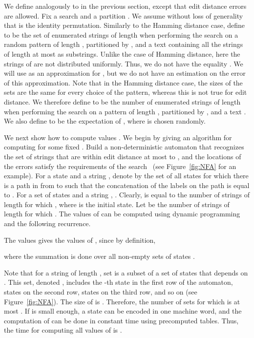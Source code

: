 \documentclass[12pt]{article}
\begin{document}
We define  analogously to 
in the previous section, except that edit distance errors are allowed.
Fix a search  and a partition .
We assume without loss of generality that  is the identity permutation.
Similarly to the Hamming distance case,
define  to be the set of enumerated strings of length 
when performing the search  on a random pattern of length ,
partitioned by ,
and a text  containing all the strings of length at most  as
substrings.
Unlike the case of Hamming distance, here the strings of  are not
distributed uniformly.
Thus, we do not have the equality
.
We will use  as an approximation
for , but we do not have an estimation
on the error of this approximation.
Note that in the Hamming distance case, the sizes of the sets  are
the same for every choice of the pattern, whereas this is not true for
edit distance.
We therefore define  to be the number of enumerated strings
of length  when performing the search  on a pattern  of length ,
partitioned by , and a text .
We also define  to be the expectation of ,
where  is chosen randomly.

We next show how to compute values .
We begin by giving an algorithm for computing  for
some fixed .
Build a non-deterministic automaton  that recognizes the
set of strings that are within edit distance at most  to , and the
locations of the errors satisfy the requirements of the
search~\cite{MihovSchulz,KarkkainenN07}
(see Figure~\ref{fig:NFA} for an example).
For a state  and a string , denote by  the set of all
states  for which there is a path in  from  to 
such that the concatenation of the labels on the path is equal to .
For a set of states  and a string ,
.
Clearly,  is equal to the number of strings  of length 
for which ,
where  is the initial state.
Let  be the number of strings  of length  for which
.
The values of  can be computed using dynamic programming
and the following recurrence.

The values  gives the values of
, since by definition,

where the summation is done over all non-empty sets of states .

Note that for a string  of length , set 
is a subset of a set of  states that depends on . This set,
denoted , includes the -th state in the first row of the
automaton, states  on the second row,
states  on the third row, and so on (see Figure~\ref{fig:NFA}).
The size of  is .
Therefore, the number of sets  for which  is at most
.
If  is small enough, a state can be encoded in one machine word,
and the computation of  can be done in constant time using
precomputed tables.
Thus, the time for computing all values of  is
.
\end{document}
